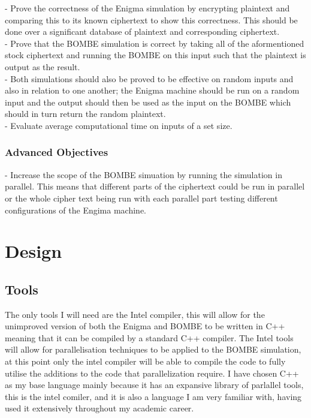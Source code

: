 \documentclass[12pt,a4paper]{article}
\begin{document}
- Prove the correctness of the Enigma simulation by encrypting plaintext and comparing this to its known ciphertext to show this correctness. This should be done over a significant database of plaintext and corresponding  ciphertext.\\
- Prove that the BOMBE simulation is correct by taking all of the aformentioned stock ciphertext and running the BOMBE on this input such that the plaintext is output as the result.\\
- Both simulations should also be proved to be effective on random inputs and also in relation to one another; the Enigma machine should be run on a random input and the output should then be used as the input on the BOMBE which should in turn return the random plaintext.\\
- Evaluate average computational time on inputs of a set size.

\subsubsection{Advanced Objectives}

- Increase the scope of the BOMBE simuation by running the simulation in parallel. This means that different parts of the ciphertext could be run in parallel or the whole cipher text being run with each parallel part testing different configurations of the Engima machine.



\section{Design}

\subsection{Tools}

The only tools I will need are the Intel compiler, this will allow for the unimproved version of both the Enigma and BOMBE to be written in C++ meaning that it can be compiled by a standard C++ compiler. The Intel tools will allow for parallelisation techniques to be applied to the BOMBE simulation, at this point only the intel compiler will be able to compile the code to fully utilise the additions to the code that parallelization require. I have chosen C++ as my base language mainly because it has an expansive library of parlallel tools, this is the intel comiler, and it is also a language I am very familiar with, having used it extensively throughout my academic career.
\end{document}
